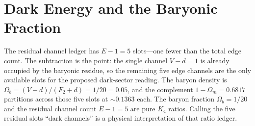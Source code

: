 \documentclass[11pt,a4paper]{book}
\begin{document}
\section{Dark Energy and the Baryonic Fraction}

The residual channel ledger has $E - 1 = 5$ slots---one fewer than the total edge count. The subtraction is the point: the single channel $V-d=1$ is already occupied by the baryonic residue, so the remaining five edge channels are the only available slots for the proposed dark-sector reading. The baryon density is $\Omega_b = (V - d)/(F_2 + d) = 1/20 = 0.05$, and the complement $1 - \Omega_m = 0.6817$ partitions across those five slots at $\sim 0.1363$ each. The baryon fraction $\Omega_b = 1/20$ and the residual channel count $E - 1 = 5$ are pure $K_4$ ratios. Calling the five residual slots ``dark channels'' is a physical interpretation of that ratio ledger.
\end{document}
